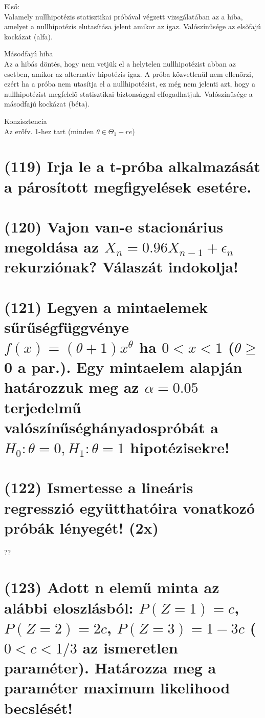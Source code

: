 \documentclass[12p]{article}
\begin{document}
Első:\\
Valamely nullhipotézis statisztikai próbával végzett vizsgálatában az a hiba, amelyet a nullhipotézis elutasítása jelent amikor az igaz. Valószínûsége az elsõfajú kockázat (alfa). 

Másodfajú hiba\\
Az a hibás döntés, hogy nem vetjük el a helytelen nullhipotézist abban az esetben, amikor az alternatív hipotézis igaz. A próba közvetlenül nem ellenõrzi, ezért ha a próba nem utasítja el a nullhipotézist, ez még nem jelenti azt, hogy a nullhipotézist megfelelõ statisztikai biztonsággal elfogadhatjuk. Valószínûsége a másodfajú kockázat (béta). 

Konzisztencia\\
Az erőfv. 1-hez tart (minden $\theta \in \Theta_1-re$)


\section{(119) Irja le a t-próba alkalmazását a párosított megfigyelések esetére.}

\section{(120) Vajon van-e stacionárius megoldása az $X_n = 0.96 X_{n-1} + \epsilon_n$ rekurziónak? Válaszát
indokolja!}

\section{(121) Legyen a mintaelemek sűrűségfüggvénye $f(x) = (\theta + 1)x^{\theta}$ ha $0 < x < 1$ ($\theta \geq$ 0 a par.).
Egy mintaelem alapján határozzuk meg az $\alpha = 0.05$ terjedelmű valószínűséghányadospróbát a $H_0 : \theta = 0, H_1 : \theta = 1$ hipotézisekre!}

\section{(122) Ismertesse a lineáris regresszió együtthatóira vonatkozó próbák lényegét! (2x)}

??

\section{(123) Adott n elemű minta az alábbi eloszlásból: $P(Z = 1) = c$, $P(Z = 2) = 2c$, $P(Z = 3) = 1 - 3c$ ($0 < c < 1/3$ az ismeretlen paraméter). Határozza meg a paraméter maximum likelihood becslését!}
\end{document}
